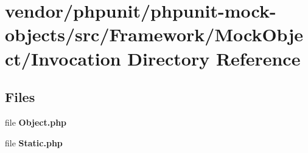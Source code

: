 \section{vendor/phpunit/phpunit-\/mock-\/objects/src/\+Framework/\+Mock\+Object/\+Invocation Directory Reference}
\label{dir_8aa95179e484b08c096b29342b98b562}
\subsection*{Files}
\begin{DoxyCompactItemize}
\item 
file {\bf Object.\+php}
\item 
file {\bf Static.\+php}
\end{DoxyCompactItemize}

